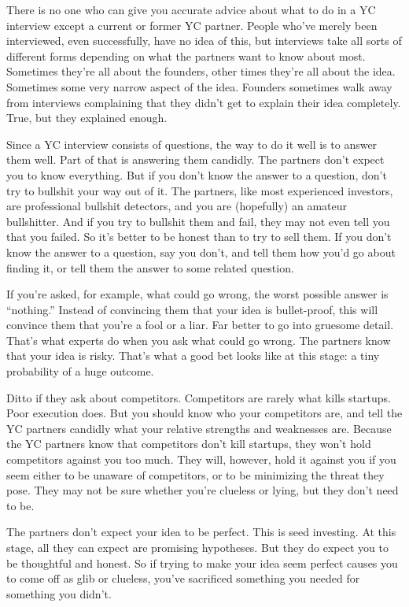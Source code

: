 \documentclass[12pt]{book}
\begin{document}
There is no one who can give you accurate advice about what to do in a
YC interview except a current or former YC partner. People who've merely
been interviewed, even successfully, have no idea of this, but
interviews take all sorts of different forms depending on what the
partners want to know about most. Sometimes they're all about the
founders, other times they're all about the idea. Sometimes some very
narrow aspect of the idea. Founders sometimes walk away from interviews
complaining that they didn't get to explain their idea completely. True,
but they explained enough.

Since a YC interview consists of questions, the way to do it well is to
answer them well. Part of that is answering them candidly. The partners
don't expect you to know everything. But if you don't know the answer to
a question, don't try to bullshit your way out of it. The partners, like
most experienced investors, are professional bullshit detectors, and you
are (hopefully) an amateur bullshitter. And if you try to bullshit them
and fail, they may not even tell you that you failed. So it's better to
be honest than to try to sell them. If you don't know the answer to a
question, say you don't, and tell them how you'd go about finding it, or
tell them the answer to some related question.

If you're asked, for example, what could go wrong, the worst possible
answer is ``nothing.'' Instead of convincing them that your idea is
bullet-proof, this will convince them that you're a fool or a liar. Far
better to go into gruesome detail. That's what experts do when you ask
what could go wrong. The partners know that your idea is risky. That's
what a good bet looks like at this stage: a tiny probability of a huge
outcome.

Ditto if they ask about competitors. Competitors are rarely what kills
startups. Poor execution does. But you should know who your competitors
are, and tell the YC partners candidly what your relative strengths and
weaknesses are. Because the YC partners know that competitors don't kill
startups, they won't hold competitors against you too much. They will,
however, hold it against you if you seem either to be unaware of
competitors, or to be minimizing the threat they pose. They may not be
sure whether you're clueless or lying, but they don't need to be.

The partners don't expect your idea to be perfect. This is seed
investing. At this stage, all they can expect are promising hypotheses.
But they do expect you to be thoughtful and honest. So if trying to make
your idea seem perfect causes you to come off as glib or clueless,
you've sacrificed something you needed for something you didn't.
\end{document}
